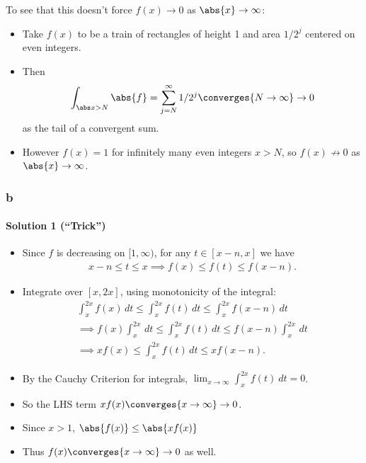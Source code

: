 \begin{solution}
To see that this doesn't force \(f(x)\to 0\) as \(\abs{x} \to \infty\):

\begin{itemize}
\tightlist
\item
  Take \(f(x)\) to be a train of rectangles of height 1 and area
  \(1/2^j\) centered on even integers.
\item
  Then
  \begin{align*}\int_{\abs x > N} \abs{f} = \sum_{j=N}^\infty 1/2^j \converges{N\to\infty}\to 0\end{align*}
  as the tail of a convergent sum.
\item
  However \(f(x) = 1\) for infinitely many even integers \(x > N\), so
  \(f(x) \not\to 0\) as \(\abs{x}\to\infty\).
\end{itemize}

\hypertarget{b-12}{%
\subsubsection{b}\label{b-12}}

\hypertarget{solution-1-trick}{%
\paragraph{Solution 1 (``Trick'')}\label{solution-1-trick}}

\begin{itemize}
\item
  Since \(f\) is decreasing on \([1, \infty)\), for any
  \(t\in [x-n, x]\) we have \begin{align*}
  x-n \leq t \leq x \implies f(x) \leq f(t) \leq f(x-n)
  .\end{align*}
\item
  Integrate over \([x, 2x]\), using monotonicity of the integral:
  \begin{align*}
  \int_x^{2x} f(x) \,dt \leq 
  \int_x^{2x} f(t) \,dt \leq 
  \int_x^{2x} f(x-n) \,dt \\ 
  \implies 
  f(x) \int_x^{2x} \,dt \leq 
  \int_x^{2x} f(t) \,dt \leq 
  f(x-n) \int_x^{2x} \,dt  \\
  \implies xf(x) \leq \int_x^{2x} f(t) \, dt \leq xf(x-n)
  .\end{align*}
\item
  By the Cauchy Criterion for integrals,
  \(\lim_{x\to \infty} \int_x^{2x} f(t)~dt = 0\).
\item
  So the LHS term \(xf(x) \converges{x\to\infty}\to 0\).
\item
  Since \(x>1\), \(\abs{f(x)} \leq \abs{xf(x)}\)
\item
  Thus \(f(x) \converges{x\to\infty}\to 0\) as well.
\end{itemize}


\end{solution}
